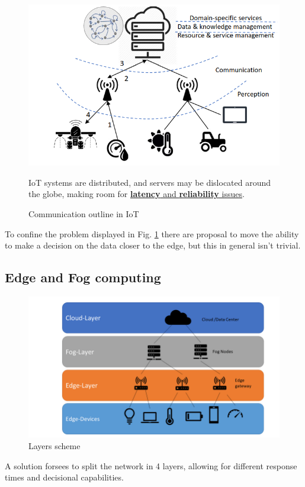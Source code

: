 \begin{figure}[htbp]
   \centering
   \includegraphics{images/iot_communication.png}
   \caption{Communication outline in IoT}
   IoT systems are distributed, and servers may be dislocated around the globe, making room for \ul{\textbf{latency} and \textbf{reliability} issues}.
   \label{fig:iot_communication}
\end{figure}

To confine the problem displayed in Fig. \ref{fig:iot_communication} there are proposal to move the ability to make a decision on the data closer to the edge, but this in general isn't trivial.


\subsection{Edge and Fog computing}
   \begin{figure}[htbp]
      \centering
      \includegraphics{images/fogedge.png}
      \caption{Layers scheme}
      \label{fig:fogedge}
   \end{figure}
A solution forsees to split the network in 4 layers, allowing for different response times and decisional capabilities.

